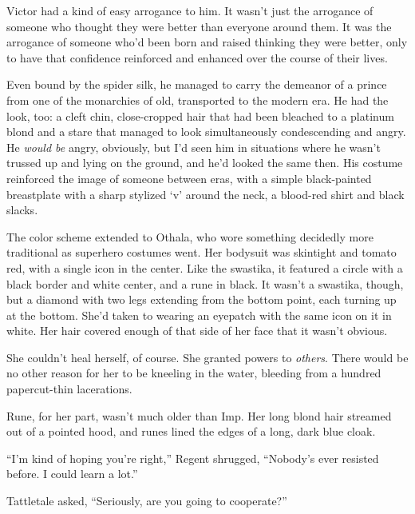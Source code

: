 Victor had a kind of easy arrogance to him.  It wasn't just the arrogance of someone who thought they were better than everyone around them.  It was the arrogance of someone who'd been born and raised thinking they were better, only to have that confidence reinforced and enhanced over the course of their lives.



Even bound by the spider silk, he managed to carry the demeanor of a prince from one of the monarchies of old, transported to the modern era.  He had the look, too: a cleft chin, close-cropped hair that had been bleached to a platinum blond and a stare that managed to look simultaneously condescending and angry.  He \emph{would be} angry, obviously, but I'd seen him in situations where he wasn't trussed up and lying on the ground, and he'd looked the same then.  His costume reinforced the image of someone between eras, with a simple black-painted breastplate with a sharp stylized `v' around the neck, a blood-red shirt and black slacks.



The color scheme extended to Othala, who wore something decidedly more traditional as superhero costumes went.  Her bodysuit was skintight and tomato red, with a single icon in the center. Like the swastika, it featured a circle with a black border and white center, and a rune in black.  It wasn't a swastika, though, but a diamond with two legs extending from the bottom point, each turning up at the bottom.  She'd taken to wearing an eyepatch with the same icon on it in white.  Her hair covered enough of that side of her face that it wasn't obvious.



She couldn't heal herself, of course.  She granted powers to \emph{others}.  There would be no other reason for her to be kneeling in the water, bleeding from a hundred papercut-thin lacerations.



Rune, for her part, wasn't much older than Imp.  Her long blond hair streamed out of a pointed hood, and runes lined the edges of a long, dark blue cloak.



``I'm kind of hoping you're right,'' Regent shrugged, ``Nobody's ever resisted before.  I could learn a lot.''



Tattletale asked, ``Seriously, are you going to cooperate?''



